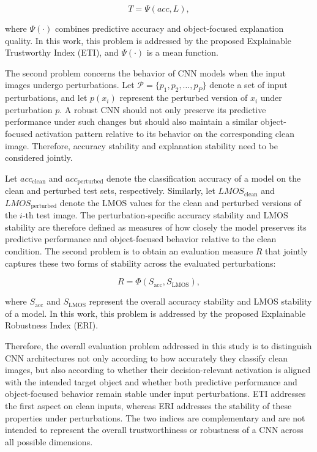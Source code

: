 \documentclass[a4paper,fleqn]{cas-dc}
\begin{document}
$$
T = \Psi(acc,L),
$$

where \(\Psi(\cdot)\) combines predictive accuracy and object-focused explanation quality. In this work, this problem is addressed by the proposed Explainable Trustworthy Index (ETI), and  \(\Psi(\cdot)\) is a mean function.

The second problem concerns the behavior of CNN models when the input images undergo perturbations. Let \(\mathcal{P}=\{p_1,p_2,\ldots,p_P\}\) denote a set of input perturbations, and let \(p(x_i)\) represent the perturbed version of \(x_i\) under perturbation \(p\). A robust CNN should not only preserve its predictive performance under such changes but should also maintain a similar object-focused activation pattern relative to its behavior on the corresponding clean image. Therefore, accuracy stability and explanation stability need to be considered jointly.

Let %
$acc_{\text{clean}}$ and $acc_{\text{perturbed}}$ denote the classification accuracy of a model on the clean and perturbed test sets, respectively. Similarly, let %
$LMOS_{\text{clean}}$ and $LMOS_{\text{perturbed}}$ denote the LMOS values for the clean and perturbed versions of the \(i\)-th test image.  The perturbation-specific accuracy stability and LMOS stability are therefore defined as measures of how closely the model preserves its predictive performance and object-focused behavior relative to the clean condition. The second problem is to obtain an evaluation measure \(R\) that jointly captures these two forms of stability across the evaluated perturbations:

$$
R = \Phi(S_{\text{acc}},  S_{\text{LMOS}}),
$$

where \(S_{\text{acc}}\) and \(S _ {\text{LMOS}} \) represent the overall accuracy stability and LMOS stability of a model. In this work, this problem is addressed by the proposed Explainable Robustness Index (ERI).

Therefore, the overall evaluation problem addressed in this study is to distinguish CNN architectures not only according to how accurately they classify clean images, but also according to whether their decision-relevant activation is aligned with the intended target object and whether both predictive performance and object-focused behavior remain stable under input perturbations. ETI addresses the first aspect on clean inputs, whereas ERI addresses the stability of these properties under perturbations. The two indices are complementary and are not intended to represent the overall trustworthiness or robustness of a CNN across all possible dimensions.
\end{document}
